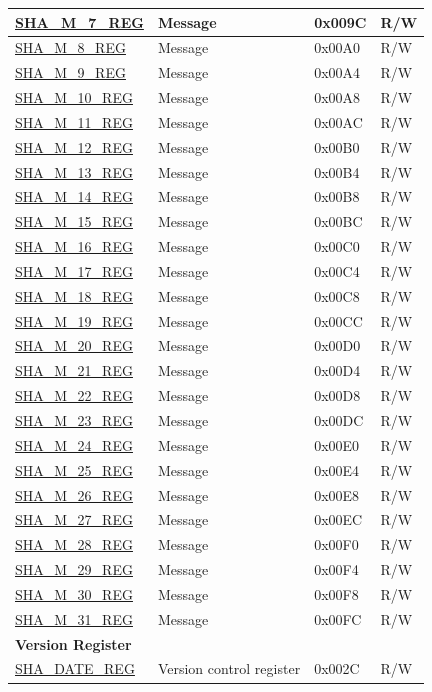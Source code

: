 \begin{longtable}{ | l | l | l |l | }
\hyperref[regdesc:SHAMNREG]{SHA\_M\_7\_REG} & Message & 0x009C & R/W \\ \hline
\hyperref[regdesc:SHAMNREG]{SHA\_M\_8\_REG} & Message & 0x00A0 & R/W \\ \hline
\hyperref[regdesc:SHAMNREG]{SHA\_M\_9\_REG} & Message & 0x00A4 & R/W \\ \hline
\hyperref[regdesc:SHAMNREG]{SHA\_M\_10\_REG} & Message & 0x00A8 & R/W \\ \hline
\hyperref[regdesc:SHAMNREG]{SHA\_M\_11\_REG} & Message & 0x00AC & R/W \\ \hline
\hyperref[regdesc:SHAMNREG]{SHA\_M\_12\_REG} & Message & 0x00B0 & R/W \\ \hline
\hyperref[regdesc:SHAMNREG]{SHA\_M\_13\_REG} & Message & 0x00B4 & R/W \\ \hline
\hyperref[regdesc:SHAMNREG]{SHA\_M\_14\_REG} & Message & 0x00B8 & R/W \\ \hline
\hyperref[regdesc:SHAMNREG]{SHA\_M\_15\_REG} & Message & 0x00BC & R/W \\ \hline
\hyperref[regdesc:SHAMNREG]{SHA\_M\_16\_REG} & Message & 0x00C0 & R/W \\ \hline
\hyperref[regdesc:SHAMNREG]{SHA\_M\_17\_REG} & Message & 0x00C4 & R/W \\ \hline
\hyperref[regdesc:SHAMNREG]{SHA\_M\_18\_REG} & Message & 0x00C8 & R/W \\ \hline
\hyperref[regdesc:SHAMNREG]{SHA\_M\_19\_REG} & Message & 0x00CC & R/W \\ \hline
\hyperref[regdesc:SHAMNREG]{SHA\_M\_20\_REG} & Message & 0x00D0 & R/W \\ \hline
\hyperref[regdesc:SHAMNREG]{SHA\_M\_21\_REG} & Message & 0x00D4 & R/W \\ \hline
\hyperref[regdesc:SHAMNREG]{SHA\_M\_22\_REG} & Message & 0x00D8 & R/W \\ \hline
\hyperref[regdesc:SHAMNREG]{SHA\_M\_23\_REG} & Message & 0x00DC & R/W \\ \hline
\hyperref[regdesc:SHAMNREG]{SHA\_M\_24\_REG} & Message & 0x00E0 & R/W \\ \hline
\hyperref[regdesc:SHAMNREG]{SHA\_M\_25\_REG} & Message & 0x00E4 & R/W \\ \hline
\hyperref[regdesc:SHAMNREG]{SHA\_M\_26\_REG} & Message & 0x00E8 & R/W \\ \hline
\hyperref[regdesc:SHAMNREG]{SHA\_M\_27\_REG} & Message & 0x00EC & R/W \\ \hline
\hyperref[regdesc:SHAMNREG]{SHA\_M\_28\_REG} & Message & 0x00F0 & R/W \\ \hline
\hyperref[regdesc:SHAMNREG]{SHA\_M\_29\_REG} & Message & 0x00F4 & R/W \\ \hline
\hyperref[regdesc:SHAMNREG]{SHA\_M\_30\_REG} & Message & 0x00F8 & R/W \\ \hline
\hyperref[regdesc:SHAMNREG]{SHA\_M\_31\_REG} & Message & 0x00FC & R/W \\ \hline
\multicolumn{4}{|l|}{\textbf{Version Register}} \\ \hline
\hyperref[regdesc:SHADATEREG]{SHA\_DATE\_REG} & Version control register & 0x002C & R/W \\ \hline
\end{longtable}
